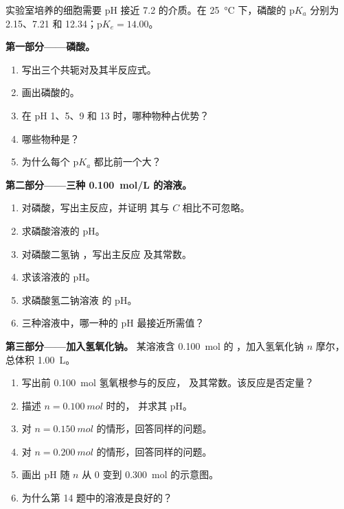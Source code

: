 \begin{problem}
\label{pb:b1:predominant-reaction:1}
实验室培养的细胞需要 pH 接近 7.2 的介质。在
\qty{25}{\celsius} 下，磷酸的 $\mathrm{p}K_a$ 分别为 2.15、7.21 和
12.34；$\mathrm{p}K_e = 14.00$。

\medskip
\noindent\textbf{第一部分——磷酸。}
\begin{enumerate}
  \item 写出三个共轭对及其半反应式。
  \item 画出磷酸的。
  \item 在 pH 1、5、9 和 13 时，哪种物种占优势？
  \item 哪些物种是？
  \item 为什么每个 $\mathrm{p}K_a$ 都比前一个大？
\end{enumerate}

\medskip
\noindent\textbf{第二部分——三种 \qty{0.100}{mol/L} 的溶液。}
\begin{enumerate}[resume]
  \item 对磷酸，写出主反应，并证明
        其与 $C$ 相比不可忽略。
  \item 求磷酸溶液的 pH。
  \item 对磷酸二氢钠 ，写出主反应
        及其常数。
  \item 求该溶液的 pH。
  \item 求磷酸氢二钠溶液
         的 pH。
  \item 三种溶液中，哪一种的 pH 最接近所需值？
\end{enumerate}

\medskip
\noindent\textbf{第三部分——加入氢氧化钠。}
某溶液含 \qty{0.100}{mol} 的 ，加入氢氧化钠
$n$ 摩尔，总体积 \qty{1.00}{L}。
\begin{enumerate}[resume]
  \item 写出前 \qty{0.100}{mol} 氢氧根参与的反应，
        及其常数。该反应是否定量？
  \item 描述 $n = \qty{0.100}{mol}$ 时的，
        并求其 pH。
  \item 对 $n = \qty{0.150}{mol}$ 的情形，回答同样的问题。
  \item 对 $n = \qty{0.200}{mol}$ 的情形，回答同样的问题。
  \item 画出 pH 随 $n$ 从 0 变到 \qty{0.300}{mol} 的示意图。
  \item 为什么第 14 题中的溶液是良好的？
\end{enumerate}


\end{problem}
